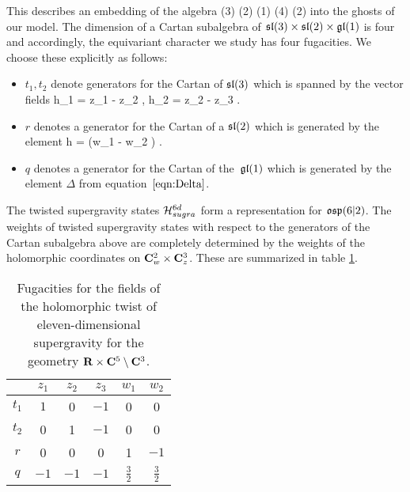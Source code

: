 This describes an embedding of the algebra 
\beqn\label{eqn:gut2}
(3) \times {}(2) \times {}(1) \subset {}(4) \times {}(2) 
\eeqn
into the ghosts of our model.
The dimension of a Cartan subalgebra of $\mathfrak{sl}(3) \times \mathfrak{sl}(2) \times \mathfrak{gl}(1)$ is four and accordingly, the equivariant character we study has four fugacities.
We choose these explicitly as follows:
\begin{itemize}
  \item $t_{1}, t_{2}$ denote generators for the Cartan of $\mathfrak{sl}(3)$ which is spanned by the vector fields
  \beqn
  h_1 = z_1  - z_2  , \quad h_2 = z_2  - z_3 .
  \eeqn
  \item $r$ denotes a generator for the Cartan of a $\mathfrak{sl}(2)$ which is generated by the element 
  \beqn
  \label{eqn:hCartan}
  h =  \left(w_1  - w_2 \right) .
  \eeqn
\item $q$ denotes a generator for the Cartan of the~$\mathfrak{gl}(1)$ which is generated by the element $\Delta$ from equation~$\eqref{eqn:Delta}$. 
\end{itemize}

The twisted supergravity states $\mathcal H_{sugra}^{6d}$ form a representation for $\mathfrak{osp}(6|2)$. 
The weights of twisted supergravity states with respect to the generators of the Cartan subalgebra above are completely determined by the weights of the holomorphic coordinates on $\mathbf{C}^2_w \times \mathbf{C}^3_z$.
These are summarized in table \ref{tbl:sugraM5}.

\begin{table}
\begin{center}
\begin{tabular}{c c c c c c}
  & $z_{1}$ & $z_{2}$ & $z_{3}$ & $w_{1}$ & $w_{2}$ \\
  \hline
  $t_{1}$ & $1$ & 0 & $-1$ & 0 & 0 \\
  $t_{2}$ & 0 & 1 & $-1$ & 0 & 0 \\
  $r$ & 0 & 0 & 0 & 1 & $-1$ \\
  $q$ & $-1$ & $-1$ & $-1$ & $\frac{3}{2}$ & $\frac{3}{2}$
\end{tabular}
\caption{Fugacities for the fields of the holomorphic twist of eleven-dimensional supergravity for the geometry $\mathbf{R} \times \mathbf{C}^5 \setminus \mathbf{C}^3$.}
\label{tbl:sugraM5}
\end{center}
\end{table}


